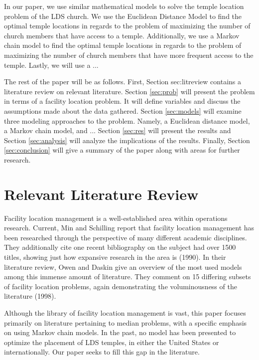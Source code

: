 \documentclass[twoside,twocolumn]{article}
\begin{document}
In our paper, we use similar mathematical models to solve the temple location problem of the LDS church. 
We use the Euclidean Distance Model to find the optimal temple locations in regards to the problem of maximizing the number of church members that have access to a temple. 
Additionally, we use a Markov chain model to find the optimal temple locations in regards to the problem of maximizing the number of church members that have more frequent access to the temple. 
Lastly, we will use a ... %

The rest of the paper will be as follows.
First, Section {sec:litreview} contains a literature review on relevant literature.
Section \ref{sec:prob} will present the problem in terms of a facility location problem.
It will define variables and discuss the assumptions made about the data gathered.
Section \ref{sec:models} will examine three modeling approaches to the problem.
Namely, a Euclidean distance model, a Markov chain model, and ... %
Section \ref{sec:res} will present the results and Section \ref{sec:analysis} will analyze the implications of the results.
Finally, Section \ref{sec:conclusion} will give a summary of the paper along with areas for further research.

\section{Relevant Literature Review}
\label{sec:litrev}
Facility location management is a well-established area within operations research. Current, Min and Schilling report that facility location management has been researched through the perspective of many different academic disciplines. They additionally cite one recent bibliography on the subject had over 1500 titles, showing just how expansive research in the area is (1990).
In their literature review, Owen and Daskin give an overview of the most used models among this immense amount of literature. 
They comment on 15 differing subsets of facility location problems, again demonstrating the voluminousness of the literature (1998).

Although the library of facility location management is vast, this paper focuses primarily on literature pertaining to median problems, with a specific emphasis on using Markov chain models. In the past, no model has been presented to optimize the placement of LDS temples, in either the United States or internationally. Our paper seeks to fill this gap in the literature.
\end{document}
